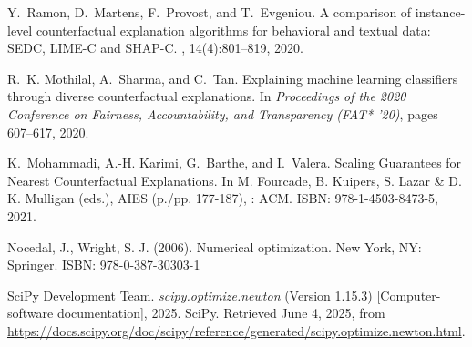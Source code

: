\documentclass[12pt]{extarticle}
\numberwithin{equation}{section}
\begin{document}
\begin{thebibliography}{99}
Y.~Ramon, D.~Martens, F.~Provost, and T.~Evgeniou.
\newblock A comparison of instance-level counterfactual explanation algorithms for behavioral and textual data: SEDC, LIME-C and SHAP-C.
, 14(4):801--819, 2020.

R.~K. Mothilal, A.~Sharma, and C.~Tan.
\newblock Explaining machine learning classifiers through diverse counterfactual explanations.
\newblock In {\em Proceedings of the 2020 Conference on Fairness, Accountability, and Transparency (FAT* '20)}, pages 607--617, 2020.

K.~Mohammadi, A.-H. Karimi, G.~Barthe, and I.~Valera.
\newblock Scaling Guarantees for Nearest Counterfactual Explanations.
\newblock In M. Fourcade, B. Kuipers, S. Lazar \& D. K. Mulligan (eds.), AIES (p./pp. 177-187), : ACM. ISBN: 978-1-4503-8473-5, 2021.

Nocedal, J., Wright, S. J. (2006). Numerical optimization.
\newblock New York, NY: Springer. ISBN: 978-0-387-30303-1
 
SciPy Development Team.
\newblock \textit{scipy.optimize.newton} (Version 1.15.3) [Computer-software documentation], 2025.
\newblock SciPy. Retrieved June 4, 2025, from \url{https://docs.scipy.org/doc/scipy/reference/generated/scipy.optimize.newton.html}.

\end{thebibliography}
\end{document}
